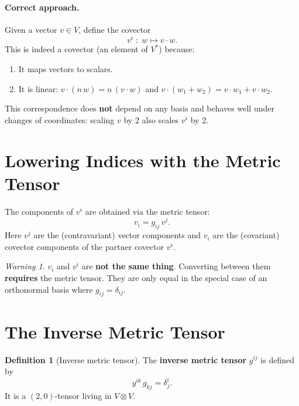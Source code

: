 \documentclass[12pt, a4paper]{report}
\theoremstyle{definition}
\newtheorem{definition}{Definition}[chapter]
\theoremstyle{plain}
\theoremstyle{remark}
\newtheorem{warning}{Warning}[chapter]
\begin{document}
\paragraph{Correct approach.}
Given a vector $v \in V$, define the covector
\begin{equation}\label{eq:v-flat}
    v^{\flat} \;:\; w \longmapsto v \cdot w.
\end{equation}
This is indeed a covector (an element of $V^*$) because:
\begin{enumerate}[nosep]
    \item It maps vectors to scalars.
    \item It is linear: $v \cdot (n\,w) = n\,(v \cdot w)$ and
          $v \cdot (w_1 + w_2) = v \cdot w_1 + v \cdot w_2$.
\end{enumerate}

This correspondence does \textbf{not} depend on any basis and behaves well under
changes of coordinates: scaling $v$ by 2 also scales $v^{\flat}$ by 2.

\section{Lowering Indices with the Metric Tensor}

The components of $v^{\flat}$ are obtained via the metric tensor:
\begin{equation}\label{eq:lower}
    \boxed{v_i = g_{ij}\, v^{j}.}
\end{equation}
Here $v^{j}$ are the (contravariant) vector components and $v_i$ are the
(covariant) covector components of the partner covector $v^{\flat}$.

\begin{warning}
$v_i$ and $v^{i}$ are \textbf{not the same thing}.  Converting between them
\textbf{requires} the metric tensor.  They are only equal in the special case of an
orthonormal basis where $g_{ij} = \delta_{ij}$.
\end{warning}

\section{The Inverse Metric Tensor}

\begin{definition}[Inverse metric tensor]
The \textbf{inverse metric tensor} $g^{ij}$ is defined by
\begin{equation}\label{eq:inv-metric}
    \boxed{g^{ik}\, g_{kj} = \delta^{i}_{j}.}
\end{equation}
It is a $(2,0)$-tensor living in $V \otimes V$.
\end{definition}
\end{document}
